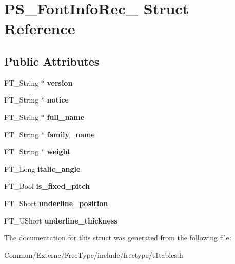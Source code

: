 \hypertarget{struct_p_s___font_info_rec__}{}\section{P\+S\+\_\+\+Font\+Info\+Rec\+\_\+ Struct Reference}
\label{struct_p_s___font_info_rec__}
\subsection*{Public Attributes}
\begin{DoxyCompactItemize}
\item 
F\+T\+\_\+\+String $\ast$ {\bfseries version}\hypertarget{struct_p_s___font_info_rec___adb595076e50f8e7ece9446f612433cfc}{}\label{struct_p_s___font_info_rec___adb595076e50f8e7ece9446f612433cfc}

\item 
F\+T\+\_\+\+String $\ast$ {\bfseries notice}\hypertarget{struct_p_s___font_info_rec___a63858ebce653f21d9aa2ddc61ee32b80}{}\label{struct_p_s___font_info_rec___a63858ebce653f21d9aa2ddc61ee32b80}

\item 
F\+T\+\_\+\+String $\ast$ {\bfseries full\+\_\+name}\hypertarget{struct_p_s___font_info_rec___a039dbf76ccc1b63b03e77215cb4b430b}{}\label{struct_p_s___font_info_rec___a039dbf76ccc1b63b03e77215cb4b430b}

\item 
F\+T\+\_\+\+String $\ast$ {\bfseries family\+\_\+name}\hypertarget{struct_p_s___font_info_rec___ac54d883f153a495f9a20dc043ed434cf}{}\label{struct_p_s___font_info_rec___ac54d883f153a495f9a20dc043ed434cf}

\item 
F\+T\+\_\+\+String $\ast$ {\bfseries weight}\hypertarget{struct_p_s___font_info_rec___a057243ec7cf62f573fa675ccb728f4b1}{}\label{struct_p_s___font_info_rec___a057243ec7cf62f573fa675ccb728f4b1}

\item 
F\+T\+\_\+\+Long {\bfseries italic\+\_\+angle}\hypertarget{struct_p_s___font_info_rec___ab558a75a56fadd54dfc71dcbeec1375a}{}\label{struct_p_s___font_info_rec___ab558a75a56fadd54dfc71dcbeec1375a}

\item 
F\+T\+\_\+\+Bool {\bfseries is\+\_\+fixed\+\_\+pitch}\hypertarget{struct_p_s___font_info_rec___a68e2d0913fe910ea86d558a4a426412a}{}\label{struct_p_s___font_info_rec___a68e2d0913fe910ea86d558a4a426412a}

\item 
F\+T\+\_\+\+Short {\bfseries underline\+\_\+position}\hypertarget{struct_p_s___font_info_rec___a772af52d17288d7846e8893e74d55212}{}\label{struct_p_s___font_info_rec___a772af52d17288d7846e8893e74d55212}

\item 
F\+T\+\_\+\+U\+Short {\bfseries underline\+\_\+thickness}\hypertarget{struct_p_s___font_info_rec___a423904e811db5195485557bf0dccf126}{}\label{struct_p_s___font_info_rec___a423904e811db5195485557bf0dccf126}

\end{DoxyCompactItemize}


The documentation for this struct was generated from the following file\+:\begin{DoxyCompactItemize}
\item 
Commun/\+Externe/\+Free\+Type/include/freetype/t1tables.\+h\end{DoxyCompactItemize}

